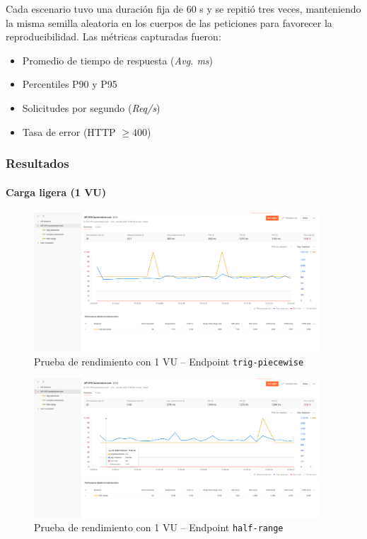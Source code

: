 Cada escenario tuvo una duración fija de 60 s y se repitió tres veces, manteniendo la
misma semilla aleatoria en los cuerpos de las peticiones para favorecer la
reproducibilidad.  
Las métricas capturadas fueron:

\begin{itemize}
	\item Promedio de tiempo de respuesta (\textit{Avg. ms})
	\item Percentiles P90 y P95
	\item Solicitudes por segundo (\textit{Req/s})
	\item Tasa de error (HTTP $\ge400$)
\end{itemize}

\subsubsection*{Resultados}

\paragraph*{Carga ligera (1 VU)}

\begin{figure}[H]
	\centering
	\includegraphics[width=0.95\textwidth]{img/chapter07/test-1user-trig.png}
	\caption{Prueba de rendimiento con 1 VU – Endpoint \texttt{trig-piecewise}}
	\label{fig:test-1user-trig}
\end{figure}

\begin{figure}[H]
	\centering
	\includegraphics[width=0.95\textwidth]{img/chapter07/test-1user-half.png}
	\caption{Prueba de rendimiento con 1 VU – Endpoint \texttt{half-range}}
	\label{fig:test-1user-half}
\end{figure}


